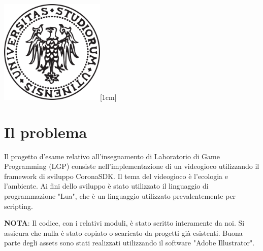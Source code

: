 \documentclass[15pt]{article}
\begin{document}
\begin{titlepage}



\includegraphics[width=50mm]{images/uniud.png}[1cm] %
 

\vfill %

\end{titlepage}
\tableofcontents
\clearpage
\section{Il problema}
Il progetto d’esame relativo all’insegnamento di Laboratorio di Game Programming (LGP) 
consiste nell’implementazione di un videogioco utilizzando il framework di sviluppo CoronaSDK.
Il tema del videogioco è l'ecologia e l'ambiente.
Ai fini dello sviluppo è stato utilizzato il linguaggio di programmazione "Lua", 
che è un linguaggio utilizzato prevalentemente per scripting.

\textbf{NOTA}: 
Il codice, con i relativi moduli, è stato scritto interamente da noi.
Si assicura che nulla è stato copiato o scaricato da progetti già esistenti. 
Buona parte degli assets sono stati realizzati utilizzando il software "Adobe Illustrator".
\end{document}
